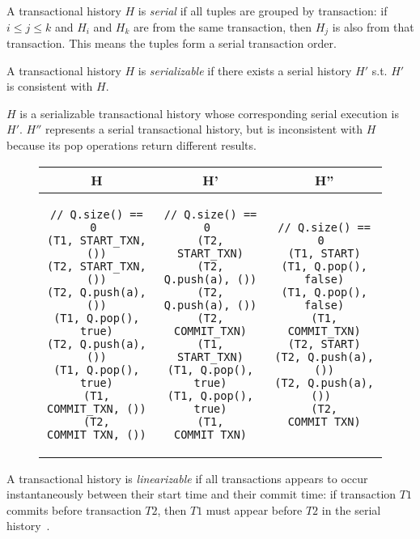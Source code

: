 \begin{defn}
    A transactional history $H$ is \emph{serial} if all tuples are grouped by transaction: if $i\le j\le k$ and $H_i$ and $H_k$ are from the same transaction, then $H_j$ is also from that transaction. This means the tuples form a serial transaction order.
\end{defn}
\begin{defn}
    A transactional history $H$ is \emph{serializable} if there exists a serial history $H'$ s.t. $H'$ is consistent with $H$.

\end{defn}

\begin{eg}
    $H$ is a serializable transactional history whose corresponding serial execution is $H'$. $H''$ represents a serial transactional history, but is inconsistent with $H$ because its pop operations return different results.
\begin{figure}[H]
\singlespacing   
   \begin{tabular}{c|c|c}
H & H' & H''\\
\hline
\begin{lstlisting}
// Q.size() == 0 
(T1, START_TXN, ())
(T2, START_TXN, ())
(T2, Q.push(a), ())
(T1, Q.pop(), true)
(T2, Q.push(a), ())
(T1, Q.pop(), true)
(T1, COMMIT_TXN, ())
(T2, COMMIT_TXN, ())
\end{lstlisting} & 
\begin{lstlisting}
// Q.size() == 0 
(T2, START_TXN)
(T2, Q.push(a), ())
(T2, Q.push(a), ())
(T2, COMMIT_TXN)
(T1, START_TXN)
(T1, Q.pop(), true)
(T1, Q.pop(), true)
(T1, COMMIT_TXN)
\end{lstlisting} &
\begin{lstlisting}
// Q.size() == 0 
(T1, START)
(T1, Q.pop(), false)
(T1, Q.pop(), false)
(T1, COMMIT_TXN)
(T2, START)
(T2, Q.push(a), ())
(T2, Q.push(a), ()) 
(T2, COMMIT_TXN)
\end{lstlisting}
\end{tabular}
\end{figure}
\end{eg}

\begin{defn}
A transactional history is \emph{linearizable} if all transactions appears to occur instantaneously between their start time and their commit time: if transaction $T1$ commits before transaction $T2$, then $T1$ must appear before $T2$ in the serial history~\cite{harristm}.
\end{defn}

